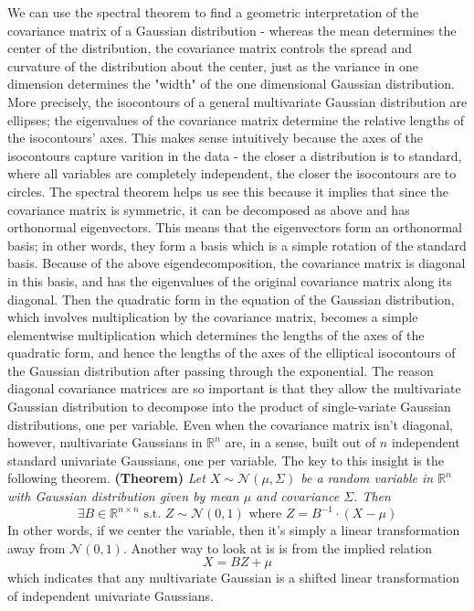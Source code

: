 \documentclass{article}
\begin{document}
We can use the spectral theorem to find a geometric interpretation of the covariance matrix of a Gaussian distribution - whereas the mean determines the center of the distribution, the covariance matrix controls the spread and curvature of the distribution about the center, just as the variance in one dimension determines the "width" of the one dimensional Gaussian distribution. More precisely, the isocontours of a general multivariate Gaussian distribution are ellipses; the eigenvalues of the covariance matrix determine the relative lengths of the isocontours' axes. This makes sense intuitively because the axes of the isocontours capture varition in the data - the closer a distribution is to standard, where all variables are completely independent, the closer the isocontours are to circles. The spectral theorem helps us see this because it implies that since the covariance matrix is symmetric, it can be decomposed as above and has orthonormal eigenvectors. This means that the eigenvectors form an orthonormal basis; in other words, they form a basis which is a simple rotation of the standard basis. Because of the above eigendecomposition, the covariance matrix is diagonal in this basis, and has the eigenvalues of the original covariance matrix along its diagonal. Then the quadratic form in the equation of the Gaussian distribution, which involves multiplication by the covariance matrix, becomes a simple elementwise multiplication which determines the lengths of the axes of the quadratic form, and hence the lengths of the axes of the elliptical isocontours of the Gaussian distribution after passing through the exponential.
\newline
The reason diagonal covariance matrices are so important is that they allow the multivariate Gaussian distribution to decompose into the product of single-variate Gaussian distributions, one per variable. Even when the covariance matrix isn't diagonal, however, multivariate Gaussians in $ \mathbb{R}^n $ are, in a sense, built out of $ n $ independent standard univariate Gaussians, one per variable. The key to this insight is the following theorem.
\newline \newline
\textbf{(Theorem)} \textit{Let $ X \sim \mathcal{N}(\mu, \Sigma) $ be a random variable in $ \mathbb{R}^n $ with Gaussian distribution given by mean $ \mu $ and covariance $ \Sigma $. Then}
$$ \exists B \in \mathbb{R}^{n \times n} \text{ s.t. } Z \sim \mathcal{N}(0, 1) \text{ where } Z = B^{-1} \cdot (X - \mu) $$
In other words, if we center the variable, then it's simply a linear transformation away from $ \mathcal{N}(0, 1) $. Another way to look at is is from the implied relation
$$ X = B Z + \mu $$
which indicates that any multivariate Gaussian is a shifted linear transformation of independent univariate Gaussians.
\end{document}
